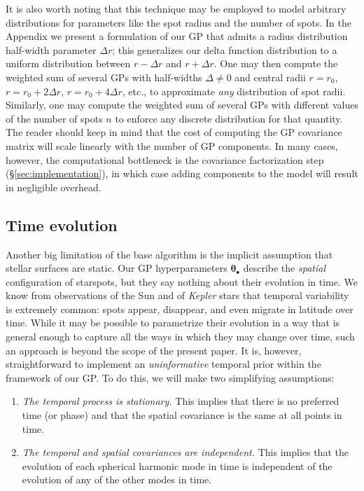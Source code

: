 \documentclass[modern]{aastex62}
\begin{document}
It is also worth noting that this technique may be employed to model arbitrary
distributions for parameters like the spot radius and the number of spots. In
the Appendix we present a formulation of our GP that admits a radius distribution
half-width parameter $\Delta r$; this generalizes our delta function distribution to
a uniform distribution between $r - \Delta r$ and $r + \Delta r$. One may then
compute the weighted sum of several GPs
with half-widths $\Delta \ne 0$ and central radii
$r = r_0$,
$r = r_0 + 2\Delta r$,
$r = r_0 + 4\Delta r$,
etc., to approximate \emph{any} distribution of spot radii. Similarly, one
may compute the weighted sum of several GPs with different values of the
number of spots $n$ to enforce any discrete distribution for that quantity.
The reader should keep in mind that the cost of computing the GP
covariance matrix will scale linearly with the number of GP components.
In many cases, however, the computational bottleneck is the covariance factorization
step (\S\ref{sec:implementation}), in which case adding components to the
model will result in negligible overhead.

\subsection{Time evolution}
\label{sec:temporal}

Another big limitation of the base algorithm is the implicit assumption that
stellar surfaces are static. Our GP hyperparameters $\pmb{\theta}_\bullet$
describe the \emph{spatial} configuration of starspots, but they say nothing
about their evolution in time. We know from observations of the Sun and of
\emph{Kepler} stars that temporal variability is extremely common: spots appear,
disappear, and even migrate in latitude over time. While it may be possible to
parametrize their evolution in a way that is general enough to capture all the
ways in which they may change over time, such an approach is beyond the scope
of the present paper. It is, however, straightforward to implement an
\emph{uninformative} temporal prior within the framework of our GP. To do this,
we will make two simplifying assumptions:

\begin{enumerate}
    \item \emph{The temporal process is stationary.} This implies that there is no
          preferred time (or phase) and that the spatial covariance is the
          same at all points in time.
    \item \emph{The temporal and spatial covariances are independent.} This implies
          that the evolution of each spherical harmonic mode in time is independent of the
          evolution of any of the other modes in time.
\end{enumerate}
\end{document}
